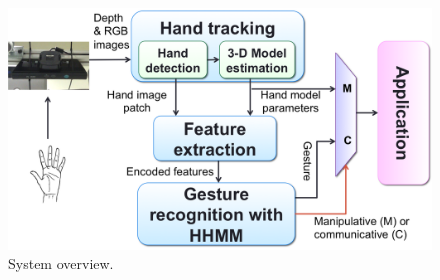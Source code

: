 \begin{figure}[h]
\centering
\includegraphics[width=\linewidth]{figures/system_overview.png}
\caption{System overview.}
\label{fig:overview}
\end{figure}

